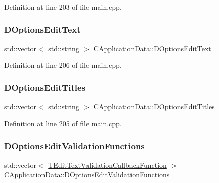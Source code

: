 Definition at line 203 of file main.\+cpp.

\hypertarget{classCApplicationData_a7044dc34cbd9d6776e8ef79eb12b5ce4}{}\label{classCApplicationData_a7044dc34cbd9d6776e8ef79eb12b5ce4} 
\subsubsection{\texorpdfstring{D\+Options\+Edit\+Text}{DOptionsEditText}}
{\footnotesize\ttfamily std\+::vector$<$ std\+::string $>$ C\+Application\+Data\+::\+D\+Options\+Edit\+Text\hspace{0.3cm}{\ttfamily [protected]}}



Definition at line 206 of file main.\+cpp.

\hypertarget{classCApplicationData_a7a322ef6b8c1db3e995c6b493230fd05}{}\label{classCApplicationData_a7a322ef6b8c1db3e995c6b493230fd05} 
\subsubsection{\texorpdfstring{D\+Options\+Edit\+Titles}{DOptionsEditTitles}}
{\footnotesize\ttfamily std\+::vector$<$ std\+::string $>$ C\+Application\+Data\+::\+D\+Options\+Edit\+Titles\hspace{0.3cm}{\ttfamily [protected]}}



Definition at line 205 of file main.\+cpp.

\hypertarget{classCApplicationData_ab76fa444142de66fdb058f390e01112c}{}\label{classCApplicationData_ab76fa444142de66fdb058f390e01112c} 
\subsubsection{\texorpdfstring{D\+Options\+Edit\+Validation\+Functions}{DOptionsEditValidationFunctions}}
{\footnotesize\ttfamily std\+::vector$<$ \hyperlink{main_8cpp_a1f079840d4510b96faa423932bed3af0}{T\+Edit\+Text\+Validation\+Callback\+Function} $>$ C\+Application\+Data\+::\+D\+Options\+Edit\+Validation\+Functions\hspace{0.3cm}{\ttfamily [protected]}}



